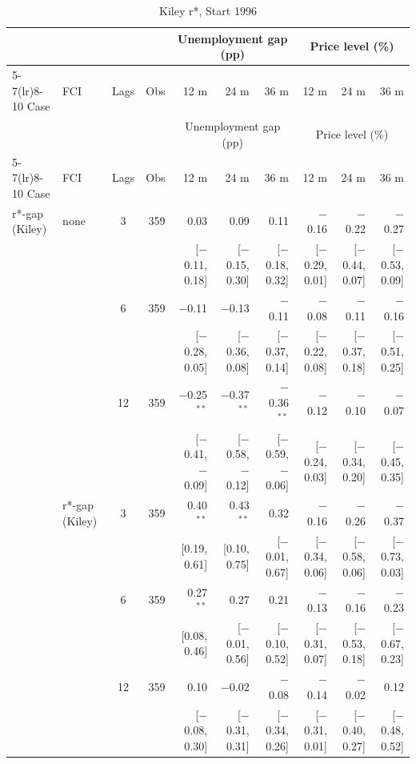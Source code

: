 \begingroup\scriptsize\setlength{\tabcolsep}{0.9pt}
\begin{longtable}{llcrrrrrrr}
\caption{Kiley r*, Start 1996}\label{tab:appR2a}\\
\toprule
 & & & & \multicolumn{3}{c}{Unemployment gap (pp)} & \multicolumn{3}{c}{Price level (\%)}\\ \cmidrule(lr){5-7}\cmidrule(lr){8-10}
Case & FCI & Lags & Obs & 12 m & 24 m & 36 m & 12 m & 24 m & 36 m\\
\midrule\endfirsthead
\toprule
 & & & & \multicolumn{3}{c}{Unemployment gap (pp)} & \multicolumn{3}{c}{Price level (\%)}\\ \cmidrule(lr){5-7}\cmidrule(lr){8-10}
Case & FCI & Lags & Obs & 12 m & 24 m & 36 m & 12 m & 24 m & 36 m\\
\midrule\endhead
\bottomrule\endfoot
r*-gap (Kiley) & none & 3 & 359 & 0.03 & 0.09 & 0.11 & $-$0.16 & $-$0.22 & $-$0.27\\
 & & & & {\scriptsize [$-$0.11, 0.18]} & {\scriptsize [$-$0.15, 0.30]} & {\scriptsize [$-$0.18, 0.32]} & {\scriptsize [$-$0.29, 0.01]} & {\scriptsize [$-$0.44, 0.07]} & {\scriptsize [$-$0.53, 0.09]}\\
 &  & 6 & 359 & $-$0.11 & $-$0.13 & $-$0.11 & $-$0.08 & $-$0.11 & $-$0.16\\
 & & & & {\scriptsize [$-$0.28, 0.05]} & {\scriptsize [$-$0.36, 0.08]} & {\scriptsize [$-$0.37, 0.14]} & {\scriptsize [$-$0.22, 0.08]} & {\scriptsize [$-$0.37, 0.18]} & {\scriptsize [$-$0.51, 0.25]}\\
 &  & 12 & 359 & $-$0.25$^{**}$ & $-$0.37$^{**}$ & $-$0.36$^{**}$ & $-$0.12 & $-$0.10 & $-$0.07\\
 & & & & {\scriptsize [$-$0.41, $-$0.09]} & {\scriptsize [$-$0.58, $-$0.12]} & {\scriptsize [$-$0.59, $-$0.06]} & {\scriptsize [$-$0.24, 0.03]} & {\scriptsize [$-$0.34, 0.20]} & {\scriptsize [$-$0.45, 0.35]}\\
 & r*-gap (Kiley) & 3 & 359 & 0.40$^{**}$ & 0.43$^{**}$ & 0.32 & $-$0.16 & $-$0.26 & $-$0.37\\
 & & & & {\scriptsize [0.19, 0.61]} & {\scriptsize [0.10, 0.75]} & {\scriptsize [$-$0.01, 0.67]} & {\scriptsize [$-$0.34, 0.06]} & {\scriptsize [$-$0.58, 0.06]} & {\scriptsize [$-$0.73, 0.03]}\\
 &  & 6 & 359 & 0.27$^{**}$ & 0.27 & 0.21 & $-$0.13 & $-$0.16 & $-$0.23\\
 & & & & {\scriptsize [0.08, 0.46]} & {\scriptsize [$-$0.01, 0.56]} & {\scriptsize [$-$0.10, 0.52]} & {\scriptsize [$-$0.31, 0.07]} & {\scriptsize [$-$0.53, 0.18]} & {\scriptsize [$-$0.67, 0.23]}\\
 &  & 12 & 359 & 0.10 & $-$0.02 & $-$0.08 & $-$0.14 & $-$0.02 & 0.12\\
 & & & & {\scriptsize [$-$0.08, 0.30]} & {\scriptsize [$-$0.31, 0.31]} & {\scriptsize [$-$0.34, 0.26]} & {\scriptsize [$-$0.31, 0.01]} & {\scriptsize [$-$0.40, 0.27]} & {\scriptsize [$-$0.48, 0.52]}\\
\end{longtable}
